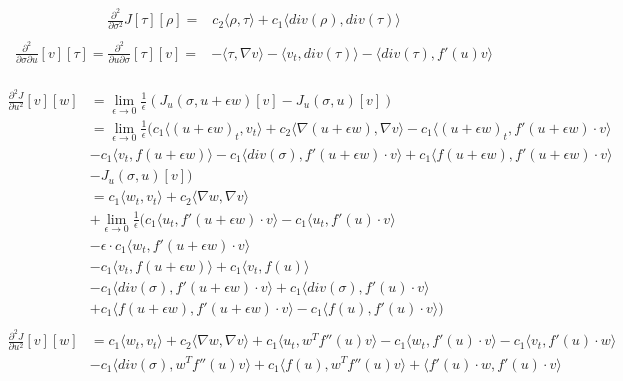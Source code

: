 \documentclass[../draft_1.tex]{subfiles}
\begin{document}
\begin{equation}
\begin{aligned}
\frac{\partial^2}{\partial \sigma^2} J [\tau] [\rho] =& c_2 \langle \rho, \tau \rangle + c_1 \langle div(\rho), div(\tau) \rangle  \\
\end{aligned}
\end{equation}
\begin{equation}
\begin{aligned}
\frac{\partial^2}{\partial \sigma \partial u} [v][\tau] = \frac{\partial^2 }{\partial u \partial \sigma} [\tau] [v]=& - \langle \tau, \nabla v \rangle - \langle v_t, div(\tau) \rangle - \langle div(\tau), f'(u) v \rangle \\
\end{aligned}
\end{equation}

\begin{equation}
\begin{aligned}
\frac{\partial^2 J}{\partial u^2} [v][w]&= \lim_{\epsilon \rightarrow 0} \frac{1}{\epsilon} (J_u(\sigma, u+ \epsilon w)[v] - J_u(\sigma, u)[v]) \\
&= \lim_{\epsilon \rightarrow 0} \frac{1}{\epsilon} ( c_1 \langle (u + \epsilon w)_t, v_t \rangle + c_2 \langle \nabla (u + \epsilon w), \nabla v \rangle - c_1 \langle (u + \epsilon w)_t, f'(u + \epsilon w) \cdot v \rangle \\
&- c_1 \langle v_t, f(u + \epsilon w) \rangle - c_1 \langle div(\sigma), f'(u + \epsilon w) \cdot v \rangle + c_1 \langle f(u + \epsilon w), f'(u + \epsilon w) \cdot v \rangle  \\
&- J_u(\sigma, u)[v]) \\
&= c_1 \langle w_t, v_t \rangle + c_2 \langle \nabla w, \nabla v \rangle \\
&+ \lim_{\epsilon \rightarrow 0} \frac{1}{\epsilon}  (c_1 \langle u_t, f'(u+ \epsilon w) \cdot v \rangle - c_1  \langle u_t, f'(u) \cdot v \rangle \\
&- \epsilon \cdot c_1 \langle w_t,  f'(u + \epsilon w) \cdot v \rangle \\
&- c_1 \langle v_t, f(u + \epsilon w) \rangle + c_1 \langle v_t, f(u) \rangle \\
& - c_1 \langle div(\sigma), f'(u + \epsilon w) \cdot v \rangle +  c_1 \langle div(\sigma), f'(u) \cdot v \rangle \\
& +  c_1 \langle f(u + \epsilon w), f'(u + \epsilon w) \cdot v \rangle - c_1 \langle f(u), f'(u) \cdot v \rangle) \\
\\
\frac{\partial^2 J}{\partial u^2} [v][w] &= c_1 \langle w_t, v_t \rangle + c_2 \langle \nabla w, \nabla v \rangle + c_1 \langle u_t, w^T f''(u) v \rangle - c_1 \langle w_t, f'(u) \cdot v \rangle - c_1 \langle v_t, f'(u) \cdot w \rangle \\
& - c_1 \langle div(\sigma), w^T f''(u) v \rangle + c_1 \langle f(u), w^T f''(u) v \rangle + \langle f'(u) \cdot w, f'(u) \cdot v \rangle 
\end{aligned}
\end{equation}
\end{document}
